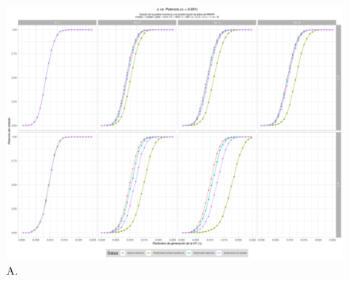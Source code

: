 \documentclass[IB,BIB]{TFUOC}%
\begin{document}
\begin{figure}[!htbp]
\hspace*{-0.8cm} %
    \centering
    \includegraphics[scale=.45]{OBJ2SimplexMANTAqloc0001.pdf}
    \caption{\scriptsize{A.}}
    \label{fig:OBJ2SimplexMANTAqloc0001}
\end{figure}
\end{document}
